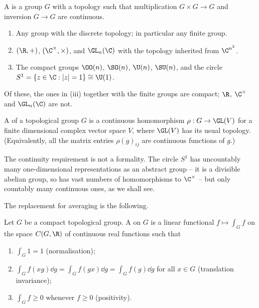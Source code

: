\begin{definition}
	A  is a group $G$ with a topology such that multiplication $G\times G\to G$ and inversion $G\to G$ are continuous.
\end{definition}

\begin{example}
	\begin{enumerate}[label=(\roman*)]
		\item Any group with the discrete topology; in particular any finite group.
		\item $(\R,+)$, $(\C^\times,\times)$, and $\GL_n(\C)$ with the topology inherited from $\C^{n^2}$.
		\item The compact groups $\OO(n)$, $\SO(n)$, $\U(n)$, $\SU(n)$, and the circle $S^1 = \{z\in\C : |z| = 1\} \cong \U(1)$.
	\end{enumerate}
	Of these, the ones in (iii) together with the finite groups are compact; $\R$, $\C^\times$ and $\GL_n(\C)$ are not.
\end{example}

\begin{definition}
	A  of a topological group $G$ is a continuous homomorphism $\rho : G \to \GL(V)$ for a finite dimensional complex vector space $V$, where $\GL(V)$ has its usual topology. (Equivalently, all the matrix entries $\rho(g)_{ij}$ are continuous functions of $g$.)
\end{definition}

The continuity requirement is not a formality. The circle $S^1$ has uncountably many one-dimensional representations as an abstract group -- it is a divisible abelian group, so has vast numbers of homomorphisms to $\C^\times$ -- but only countably many continuous ones, as we shall see.

The replacement for averaging is the following.

\begin{definition}
	Let $G$ be a compact topological group. A  on $G$ is a linear functional $f\mapsto\int_Gf$ on the space $C(G,\R)$ of continuous real functions such that
	\begin{enumerate}[label=(\roman*)]
		\item $\int_G 1 = 1$ (normalisation);
		\item $\int_G f(xg)\dd g = \int_G f(gx)\dd g = \int_G f(g)\dd g$ for all $x\in G$ (translation invariance);
		\item $\int_G f \geq 0$ whenever $f\geq0$ (positivity).
	\end{enumerate}
\end{definition}

